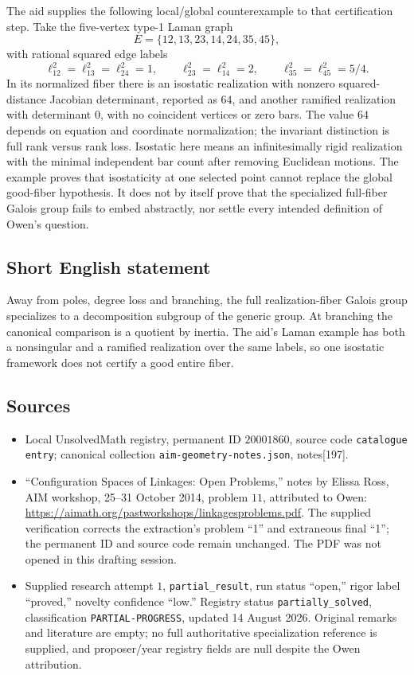 \documentclass[11pt]{article}
\begin{document}
The aid supplies the following local/global counterexample to that certification step. Take the five-vertex type-1 Laman graph
\[
 E=\{12,13,23,14,24,35,45\},
\]
with rational squared edge labels
\[
 \ell_{12}^2=\ell_{13}^2=\ell_{24}^2=1,\qquad
 \ell_{23}^2=\ell_{14}^2=2,\qquad
 \ell_{35}^2=\ell_{45}^2=5/4.
\]
In its normalized fiber there is an isostatic realization with nonzero squared-distance Jacobian determinant, reported as \(64\), and another ramified realization with determinant \(0\), with no coincident vertices or zero bars. The value \(64\) depends on equation and coordinate normalization; the invariant distinction is full rank versus rank loss. Isostatic here means an infinitesimally rigid realization with the minimal independent bar count after removing Euclidean motions. The example proves that isostaticity at one selected point cannot replace the global good-fiber hypothesis. It does not by itself prove that the specialized full-fiber Galois group fails to embed abstractly, nor settle every intended definition of Owen's question.
\subsection{Short English statement}
Away from poles, degree loss and branching, the full realization-fiber Galois group specializes to a decomposition subgroup of the generic group. At branching the canonical comparison is a quotient by inertia. The aid's Laman example has both a nonsingular and a ramified realization over the same labels, so one isostatic framework does not certify a good entire fiber.
\subsection{Sources}
\begin{itemize}
\item Local UnsolvedMath registry, permanent ID \(20001860\), source code \texttt{catalogue entry}; canonical collection \texttt{aim-geometry-notes.json}, notes[197].
\item ``Configuration Spaces of Linkages: Open Problems,'' notes by Elissa Ross, AIM workshop, 25--31 October 2014, problem \(11\), attributed to Owen: \url{https://aimath.org/pastworkshops/linkagesproblems.pdf}. The supplied verification corrects the extraction's problem ``1'' and extraneous final ``1''; the permanent ID and source code remain unchanged. The PDF was not opened in this drafting session.
\item Supplied research attempt \(1\), \texttt{partial\_result}, run status ``open,'' rigor label ``proved,'' novelty confidence ``low.'' Registry status \texttt{partially\_solved}, classification \texttt{PARTIAL-PROGRESS}, updated 14 August 2026. Original remarks and literature are empty; no full authoritative specialization reference is supplied, and proposer/year registry fields are null despite the Owen attribution.
\end{itemize}
\end{document}
